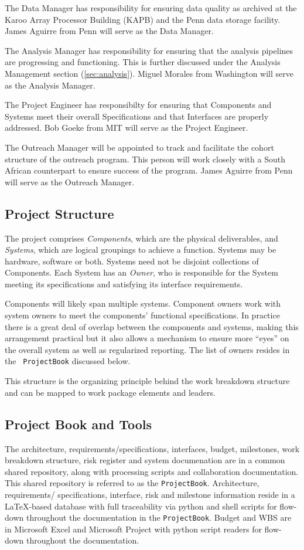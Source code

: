 \documentclass[preprint]{aastex}
\begin{document}
The Data Manager has responsibility for ensuring data quality as archived at the Karoo Array Processor 
Building (KAPB) and the Penn data storage facility.  James Aguirre from Penn will serve as the Data Manager.

The Analysis Manager has responsibility for ensuring that the analysis pipelines are progressing and functioning.
This is further discussed under the Analysis Management section (\ref{sec:analysis}).
Miguel Morales from Washington will serve as the Analysis Manager.

The Project Engineer has responsibilty for ensuring that Components and Systems meet their overall
Specifications and that Interfaces are properly addressed.  Bob Goeke from MIT will serve as the
Project Engineer.

The Outreach Manager will be appointed to track and facilitate the cohort structure of the outreach program.
This person will work closely with a South African counterpart to ensure success of the program.    James
Aguirre from Penn will serve as the Outreach Manager.

\subsection{Project Structure}
The project comprises {\em Components}, which are the physical deliverables, and {\em Systems},
which are logical groupings to achieve a function. Systems may be hardware, software
or both. Systems need not be disjoint collections of Components. Each System has an
{\em Owner}, who is responsible for the System meeting its specifications and satisfying
its interface requirements.

Components will likely span multiple systems. Component owners work with system
owners to meet the components' functional specifications. In practice there is a
great deal of overlap between the components and systems, making this arrangement
practical but it also allows a mechanism to ensure more ``eyes'' on the overall
system as well as regularized reporting. The list of owners resides in the {\tt
ProjectBook} discussed below.

This structure is the organizing principle behind the work breakdown structure and
can be mapped to work package elements and leaders.

\subsection{Project Book and Tools}
The architecture, requirements/specifications, interfaces, budget, milestones, work
breakdown structure, risk register and system documenation are in a common
shared repository, along with processing scripts and collaboration documentation.
This shared repository is referred to as the {\tt ProjectBook}. Architecture,
requirements/ specifications, interface, risk and milestone information reside in a
\LaTeX-based database with full traceability via python and shell scripts for
flow-down throughout the documentation in the {\tt ProjectBook}. Budget and WBS are
in Microsoft Excel and Microsoft Project with python script readers for flow-down
throughout the documentation.
\end{document}
